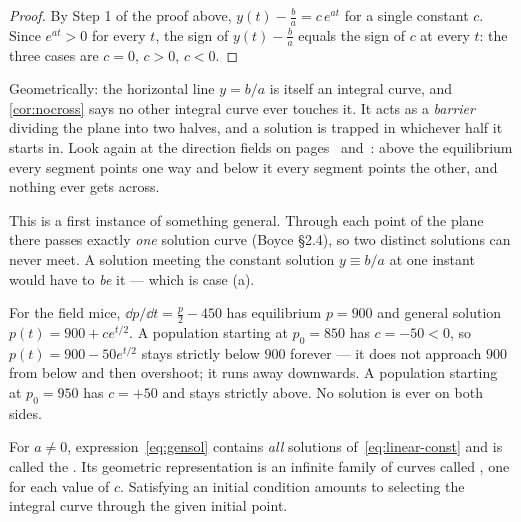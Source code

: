 \begin{proof}
	By Step 1 of the proof above, \(y(t) - \frac ba = c\,e^{at}\) for a single constant
	\(c\). Since \(e^{at} > 0\) for every \(t\), the sign of \(y(t) - \frac ba\) equals
	the sign of \(c\) at every \(t\): the three cases are \(c = 0\), \(c > 0\), \(c < 0\).
\end{proof}

\begin{intuition}
	Geometrically: the horizontal line \(y = b/a\) is itself an integral curve, and
	\autoref{cor:nocross} says no other integral curve ever touches it. It acts as a
	\emph{barrier} dividing the plane into two halves, and a solution is trapped in
	whichever half it starts in. Look again at the direction fields on
	pages~\pageref{fig:dirfield-fall} and~\pageref{fig:dirfield-mice}: above the
	equilibrium every segment points one way and below it every segment points the other,
	and nothing ever gets across.

	This is a first instance of something general. Through each point of the plane there
	passes exactly \emph{one} solution curve (Boyce §2.4), so two distinct solutions can
	never meet. A solution meeting the constant solution \(y \equiv b/a\) at one instant
	would have to \emph{be} it --- which is case (a).
\end{intuition}

\begin{eg}[Concretely]
	For the field mice, \(\dd p/\dd t = \frac p2 - 450\) has equilibrium \(p = 900\) and
	general solution \(p(t) = 900 + ce^{t/2}\). A population starting at \(p_0 = 850\)
	has \(c = -50 < 0\), so \(p(t) = 900 - 50e^{t/2}\) stays strictly below \(900\)
	forever --- it does not approach \(900\) from below and then overshoot; it runs away
	downwards. A population starting at \(p_0 = 950\) has \(c = +50\) and stays strictly
	above. No solution is ever on both sides.
\end{eg}

\begin{definition}
	For \(a \neq 0\), expression~\eqref{eq:gensol} contains \emph{all} solutions
	of~\eqref{eq:linear-const} and is called the . Its geometric
	representation is an infinite family of curves called , one
	for each value of \(c\). Satisfying an initial condition amounts to selecting the
	integral curve through the given initial point.
\end{definition}

